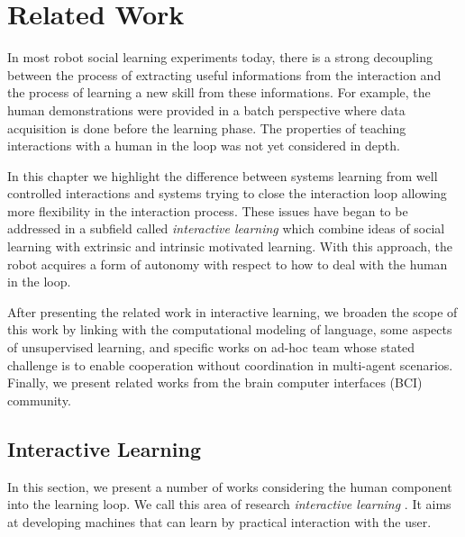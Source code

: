 
\chapter{Related Work}
\label{chapter:relatedwork}
\minitoc


In most robot social learning experiments today, there is a strong decoupling between the process of extracting useful informations from the interaction and the process of learning a new skill from these informations. For example, the human demonstrations were provided in a batch perspective where data acquisition is done before the learning phase. The properties of teaching interactions with a human in the loop was not yet considered in depth.

In this chapter we highlight the difference between systems learning from well controlled interactions and systems trying to close the interaction loop allowing more flexibility in the interaction process. These issues have began to be addressed in a subfield called \emph{interactive learning}  which combine ideas of social learning with extrinsic and intrinsic motivated learning. With this approach, the robot acquires a form of autonomy with respect to how to deal with the human in the loop. 

After presenting the related work in interactive learning, we broaden the scope of this work by linking with the computational modeling of language, some aspects of unsupervised learning, and specific works on ad-hoc team whose stated challenge is to enable cooperation without coordination in multi-agent scenarios. Finally, we present related works from the brain computer interfaces (BCI) community.

\section{Interactive Learning}

In this section, we present a number of works considering the human component into the learning loop. We call this area of research \emph{interactive learning} \cite{nicolescu2003natural,breazeal2004tutelage}. It aims at developing machines that can learn by practical interaction with the user.


